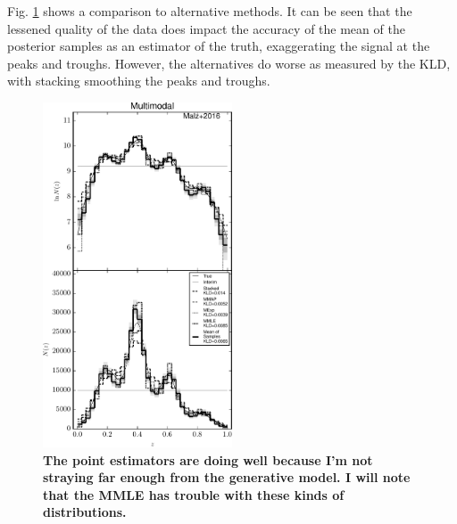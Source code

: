 \documentclass[preprint]{aastex}
\begin{document}
Fig. \ref{fig:multi-comp} shows a comparison to alternative methods.  It can be 
seen that the lessened quality of the data does impact the accuracy of the mean 
of the posterior samples as an estimator of the truth, exaggerating the signal 
at the peaks and troughs.  However, the alternatives do worse as measured by 
the KLD, with stacking smoothing the peaks and troughs.


\begin{figure}
\includegraphics[width=0.5\textwidth]{figs/mult/comps.pdf}
\caption{\textbf{The point estimators are doing well because I'm not straying 
far enough from the generative model.  I will note that the MMLE has trouble 
with these kinds of distributions.}}
\label{fig:multi-comp}
\end{figure}
\end{document}

